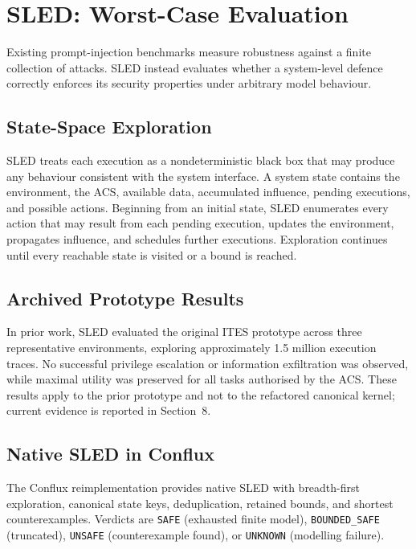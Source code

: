 \documentclass{article}
\begin{document}
\section{SLED: Worst-Case Evaluation}

Existing prompt-injection benchmarks measure robustness against a finite
collection of attacks. SLED instead evaluates whether a system-level
defence correctly enforces its security properties under arbitrary model
behaviour.

\subsection{State-Space Exploration}

SLED treats each execution as a nondeterministic black box that may produce
any behaviour consistent with the system interface. A system state contains
the environment, the ACS, available data, accumulated influence, pending
executions, and possible actions. Beginning from an initial state, SLED
enumerates every action that may result from each pending execution,
updates the environment, propagates influence, and schedules further
executions. Exploration continues until every reachable state is visited
or a bound is reached.



\subsection{Archived Prototype Results}

In prior work, SLED evaluated the original ITES prototype across three
representative environments, exploring approximately 1.5 million execution
traces. No successful privilege escalation or information exfiltration was
observed, while maximal utility was preserved for all tasks authorised by
the ACS. These results apply to the prior prototype and not to the
refactored canonical kernel; current evidence is reported in Section~8.

\subsection{Native SLED in Conflux}

The Conflux reimplementation provides native SLED with breadth-first
exploration, canonical state keys, deduplication, retained bounds, and
shortest counterexamples. Verdicts are \texttt{SAFE} (exhausted finite
model), \texttt{BOUNDED\_SAFE} (truncated), \texttt{UNSAFE}
(counterexample found), or \texttt{UNKNOWN} (modelling failure).
\end{document}
